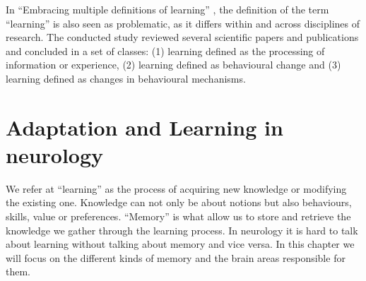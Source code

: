 \documentclass[conference]{IEEEtran}
\begin{document}
	In ``Embracing multiple definitions of learning'' \cite{b6}, the definition of the term “learning” is also seen as problematic, as it differs within and across disciplines of research. The conducted study reviewed several scientific papers and publications and concluded in a set of classes: (1) learning defined as the processing of information or experience, (2) learning defined as behavioural change and (3) learning defined as changes in behavioural mechanisms.

\section{Adaptation and Learning in neurology}
	We refer at ``learning'' as the process of acquiring new knowledge or modifying the existing one. Knowledge can not only be about notions but also behaviours, skills, value or preferences.\cite{b7}
	``Memory'' is what allow us to store and retrieve the knowledge we gather through the learning process.
	In neurology it is hard to talk about learning without talking about memory and vice versa. In this chapter we will focus on the different kinds of memory and the brain areas responsible for them.
\end{document}
